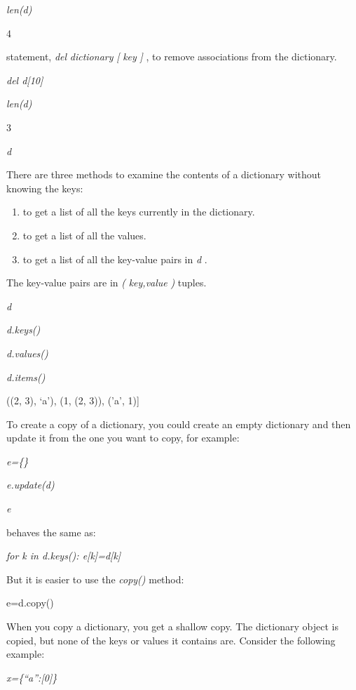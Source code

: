 \emph{len(d)}

4


statement, \emph{del} \emph{dictionary} \emph{{[}} \emph{key} \emph{{]}}
, to remove associations from the dictionary.


\emph{del d{[}10{]}}


\emph{len(d)}

3


\emph{d}



There are three methods to examine
the contents of a dictionary without knowing the keys:

\begin{enumerate}
\tightlist
\item
   to get a
  list of all the keys currently in the dictionary.
\item
   to get a
  list of all the values.
\item
   to get a
  list of all the key-value pairs in \emph{d} .
\end{enumerate}

The key-value pairs are in
\emph{(} \emph{key,value} \emph{)} tuples.


\emph{d}




\emph{d.keys()}




\emph{d.values()}




\emph{d.items()}

((2, 3), `a'), (1, (2, 3)),
('a', 1){]}

To create a copy of a dictionary,
you could create an empty dictionary and then update it from the one you
want to copy, for example:


\emph{e=\{\}}


\emph{e.update(d)}


\emph{e}




behaves the same as:


\emph{for k in d.keys(): e{[}k{]}=d{[}k{]}}

But it is easier to use the
\emph{copy()} method:

e=d.copy()

When you copy a dictionary, you
get a shallow copy. The dictionary object is copied, but none of the
keys or values it contains are. Consider the following example:


\emph{x=\{``a'':{[}0{]}\}}


